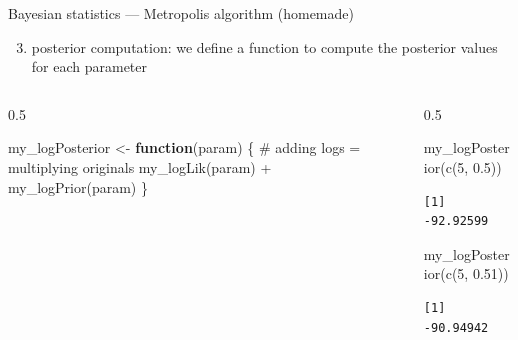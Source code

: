 \documentclass[
  ignorenonframetext,
  aspectratio=169,
  t]{beamer}
\newenvironment{Shaded}{\begin{snugshade}}{\end{snugshade}}
\newcommand{\CommentTok}[1]{\textcolor[rgb]{0.37,0.37,0.37}{#1}}
\newcommand{\ControlFlowTok}[1]{\textcolor[rgb]{0.00,0.23,0.31}{\textbf{#1}}}
\newcommand{\DecValTok}[1]{\textcolor[rgb]{0.68,0.00,0.00}{#1}}
\newcommand{\FloatTok}[1]{\textcolor[rgb]{0.68,0.00,0.00}{#1}}
\newcommand{\FunctionTok}[1]{\textcolor[rgb]{0.28,0.35,0.67}{#1}}
\newcommand{\NormalTok}[1]{\textcolor[rgb]{0.00,0.23,0.31}{#1}}
\newcommand{\OtherTok}[1]{\textcolor[rgb]{0.00,0.23,0.31}{#1}}
\newcommand{\SpecialCharTok}[1]{\textcolor[rgb]{0.37,0.37,0.37}{#1}}
\providecommand{\tightlist}{%
  \setlength{\itemsep}{0pt}\setlength{\parskip}{0pt}}
\newcommand{\bluenorm}[1]{\textcolor{bluebeamer}{#1}}
\begin{document}
\begin{frame}[fragile]{Bayesian statistics --- Metropolis algorithm
(homemade)}
\protect{}\label{bayesian-statistics-metropolis-algorithm-homemade-2}
\begin{enumerate}
\setcounter{enumi}{2}
\tightlist
\item
  \bluenorm{posterior computation}: we define a function to compute the
  posterior values for each parameter
\end{enumerate}

\begin{columns}[T]
\begin{column}{0.5\linewidth}
\footnotesize

\begin{Shaded}
\begin{Highlighting}[]
\NormalTok{my\_logPosterior }\OtherTok{\textless{}{-}} \ControlFlowTok{function}\NormalTok{(param) \{}
    \CommentTok{\# adding logs = multiplying originals}
    \FunctionTok{my\_logLik}\NormalTok{(param) }\SpecialCharTok{+} \FunctionTok{my\_logPrior}\NormalTok{(param)}
\NormalTok{\}}
\end{Highlighting}
\end{Shaded}

\normalsize
\end{column}

\begin{column}{0.5\linewidth}
\footnotesize

\begin{Shaded}
\begin{Highlighting}[]
\FunctionTok{my\_logPosterior}\NormalTok{(}\FunctionTok{c}\NormalTok{(}\DecValTok{5}\NormalTok{, }\FloatTok{0.5}\NormalTok{))}
\end{Highlighting}
\end{Shaded}

\begin{verbatim}
[1] -92.92599
\end{verbatim}

\begin{Shaded}
\begin{Highlighting}[]
\FunctionTok{my\_logPosterior}\NormalTok{(}\FunctionTok{c}\NormalTok{(}\DecValTok{5}\NormalTok{, }\FloatTok{0.51}\NormalTok{))}
\end{Highlighting}
\end{Shaded}

\begin{verbatim}
[1] -90.94942
\end{verbatim}

\normalsize
\end{column}
\end{columns}
\end{frame}
\end{document}
